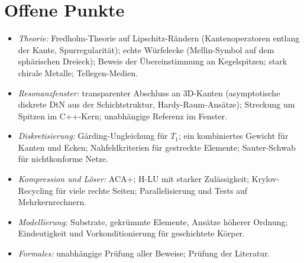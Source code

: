 \documentclass[11pt, a4paper]{article}
\begin{document}
\section{Offene Punkte}
\begin{itemize}[leftmargin=*]
  \item \emph{Theorie:} Fredholm-Theorie auf Lipschitz-Rändern (Kantenoperatoren entlang der
    Kante, Spurregularität); echte Würfelecke (Mellin-Symbol auf dem sphärischen Dreieck);
    Beweis der Übereinstimmung an Kegelspitzen; stark chirale Metalle; Tellegen-Medien.
  \item \emph{Resonanzfenster:} transparenter Abschluss an 3D-Kanten (asymptotische diskrete DtN aus der
    Schichtstruktur, Hardy-Raum-Ansätze); Streckung um Spitzen im C++-Kern; unabhängige Referenz im Fenster.
  \item \emph{Diskretisierung:} Gårding-Ungleichung für $T_1$; ein kombiniertes Gewicht für Kanten und Ecken;
    Nahfeldkriterien für gestreckte Elemente; Sauter-Schwab für nichtkonforme Netze.
  \item \emph{Kompression und Löser:} ACA+; H-LU mit starker Zulässigkeit; Krylov-Recycling für viele rechte Seiten;
    Parallelisierung und Tests auf Mehrkernrechnern.
  \item \emph{Modellierung:} Substrate, gekrümmte Elemente, Ansätze höherer Ordnung; Eindeutigkeit und
    Vorkonditionierung für geschichtete Körper.
  \item \emph{Formales:} unabhängige Prüfung aller Beweise; Prüfung der Literatur.
\end{itemize}
\end{document}
